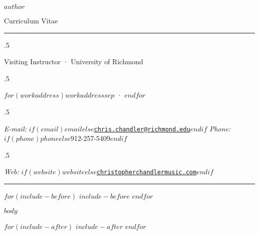 \documentclass[plain, titleabove]{simplecv}
\begin{document}
\thispagestyle{empty} 		%

\centerline{\Large \textsc{$author$}}

\vspace{1 mm}

\centerline{\normalsize Curriculum Vitae}

\vspace{2 mm}

\hrule

\vspace{2 mm}

\moveleft.5\hoffset\centerline{Visiting Instructor · University of Richmond}
\moveleft.5\hoffset\centerline{$for(workaddress)$$workaddress$$sep$ · $endfor$}
\moveleft.5\hoffset\centerline{
	\emph{E-mail:} \href{mailto:}{\tt $if(email)$$email$$else$chris.chandler@richmond.edu$endif$}
	\hspace{1 mm}
	\emph{Phone:} $if(phone)$$phone$$else$912-257-5409$endif$}
\moveleft.5\hoffset\centerline{
	\emph{Web:} $if(website)$\href{$website$}{\tt $website$}$else$\href{http://christopherchandlermusic.com}{\tt christopherchandlermusic.com}$endif$}

\vspace{2 mm}

\hrule

$for(include-before)$
	$include-before$
$endfor$

$body$

$for(include-after)$
	$include-after$
$endfor$
\end{document}
